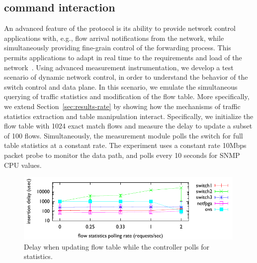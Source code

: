 \subsection{\of command interaction}\label{sec:results-interactions}


An advanced feature of the \of protocol is its ability to
provide network control applications with, e.g., flow arrival notifications from the 
network, while simultaneously providing fine-grain control of 
the forwarding process. This permits applications to adapt
in real time to the requirements and load of the
network~\cite{plug_n_serv,Yap09}. Using \oflops advanced measurement
instrumentation, we develop a test scenario of dynamic network control,
in order to understand the behavior of the switch
control and data plane.  In this scenario, we emulate the simultaneous querying of traffic statistics and
modification of the flow table.  
More specifically, we extend Section~\ref{sec:results-rate} by showing
how the mechanisms of traffic statistics extraction and table manipulation 
interact. Specifically, we initialize the flow table with 1024 exact
match flows and measure the delay to update a subset of 100 flows. 
Simultaneously, the measurement module polls the switch for full table 
statistics at a constant rate. The experiment uses a constant rate 10Mbps 
packet probe to monitor the data path, and polls every 10 seconds for SNMP 
CPU values.

\begin{figure}[t!!]
  \begin{center}
    \includegraphics[width=0.99\textwidth]{interaction_test}
  \end{center}
  \caption{Delay when updating  flow table while the controller polls
    for statistics.}
  \label{fig:interaction_test}
\end{figure}

